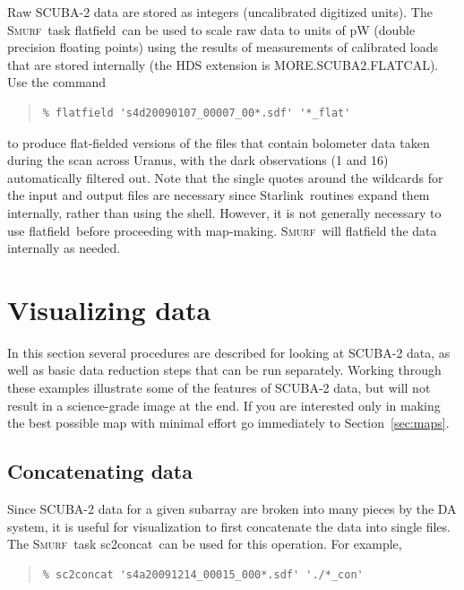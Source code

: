 \documentclass[twoside,11pt]{article}
\newcommand{\htmladdnormallink}[2]{#1}
\newcommand{\xref}[3]{#1}
\newcommand{\xlabel}[1]{}
\renewcommand{\_}{\texttt{\symbol{95}}}
\newenvironment{myquote}{\begin{quote}\begin{small}}{\end{small}\end{quote}}
\newcommand{\starlink}{\htmladdnormallink{Starlink}{http://starlink.jach.hawaii.edu}}
\newcommand{\smurf}{\xref{\textsc{Smurf}}{sun258}{}}
\newcommand{\task}[1]{\textsf{#1}}
\newcommand{\concat}{\xref{\task{sc2concat}}{sun258}{SC2CONCAT}}
\newcommand{\flatfield}{\xref{\task{flatfield}}{sun258}{FLATFIELD}}
\begin{document}
Raw SCUBA-2 data are stored as integers (uncalibrated digitized
units). The \smurf\ task \flatfield\ can be used to scale raw data to
units of pW (double precision floating points) using the results of
measurements of calibrated loads that are stored internally (the HDS
extension is MORE.SCUBA2.FLATCAL). Use the command

\begin{myquote}
\begin{verbatim}
% flatfield 's4d20090107_00007_00*.sdf' '*_flat'
\end{verbatim}
\end{myquote}
%
to produce flat-fielded versions of the files that contain bolometer
data taken during the scan across Uranus, with the dark observations
(1 and 16) automatically filtered out. Note that the single quotes
around the wildcards for the input and output files are necessary
since \starlink\ routines expand them internally, rather than using
the shell. However, it is not generally necessary to use \flatfield\
before proceeding with map-making. \smurf\ will flatfield the data
internally as needed.

\section{\xlabel{time_series}Visualizing data}
\label{sec:visual}

In this section several procedures are described for looking at
SCUBA-2 data, as well as basic data reduction steps that can be run
separately. Working through these examples illustrate some of the
features of SCUBA-2 data, but will not result in a science-grade image
at the end. If you are interested only in making the best possible map
with minimal effort go immediately to Section~\ref{sec:maps}.

\subsection{\xlabel{concat}Concatenating data}

Since SCUBA-2 data for a given subarray are broken into many pieces by
the DA system, it is useful for visualization to first concatenate the
data into single files. The \smurf\ task \concat\ can be used for this
operation. For example,

\begin{myquote}
\begin{verbatim}
% sc2concat 's4a20091214_00015_000*.sdf' './*_con'
\end{verbatim}
\end{myquote}
\end{document}
